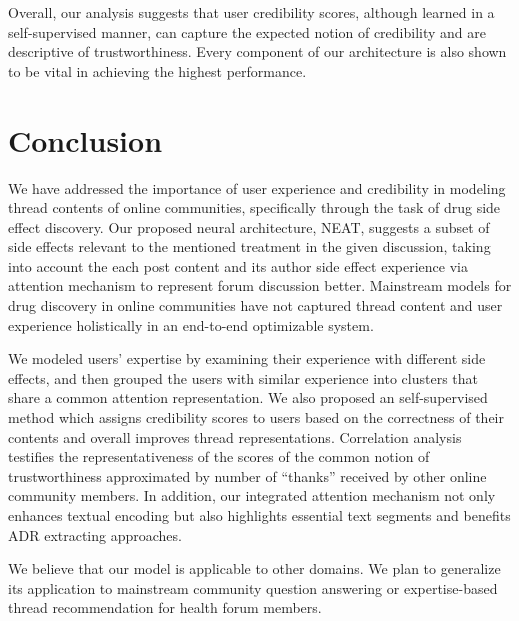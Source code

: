 \documentclass{bmcart}
\begin{document}
Overall, our analysis suggests that user credibility scores, although learned in a self-supervised manner, can capture the expected notion of credibility and are descriptive of trustworthiness. Every component of our architecture is also shown to be vital in achieving the highest performance.

\section{Conclusion}\label{sec:conclusion}
We have addressed the importance of user experience and credibility in
modeling thread contents of online communities, specifically through
the task of drug side effect discovery. 
Our proposed neural architecture, NEAT, suggests a subset of side effects relevant to 
the mentioned treatment in the given discussion, 
taking into account the each post content and its
author side effect experience via attention mechanism to represent forum discussion better. Mainstream models for drug discovery in online communities have not captured thread content and user experience holistically in an end-to-end optimizable system.

We modeled users' expertise by examining their experience with different side effects, and then grouped the users with similar experience into clusters that
share a common attention representation. We also proposed an self-supervised method which assigns credibility scores to users based on the correctness of their contents and overall improves thread representations. Correlation analysis testifies the representativeness of the scores of the common notion of trustworthiness approximated by number of ``thanks'' received by other online community members. In addition, our integrated attention mechanism not only enhances textual encoding but also highlights essential text segments and benefits ADR extracting approaches.

We believe that our model is applicable to other domains. We plan to generalize its application to mainstream community question answering or expertise-based thread recommendation for health forum members.


\newpage
\end{document}
